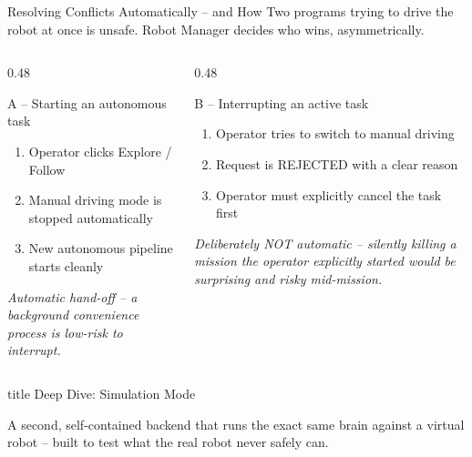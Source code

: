\documentclass[aspectratio=169, 11pt]{beamer}
\begin{document}
\begin{frame}{Resolving Conflicts Automatically -- and How}
  \small
  Two programs trying to drive the robot at once is unsafe. Robot Manager decides who wins, asymmetrically.
  \vspace{0.2cm}
  \begin{columns}[T]
    \begin{column}{0.48\textwidth}
      \begin{block}{A -- Starting an autonomous task}
        \footnotesize
        \begin{enumerate}
          \item Operator clicks Explore / Follow
          \item Manual driving mode is stopped automatically
          \item New autonomous pipeline starts cleanly
        \end{enumerate}
        \textit{Automatic hand-off -- a background convenience process is low-risk to interrupt.}
      \end{block}
    \end{column}
    \begin{column}{0.48\textwidth}
      \begin{block}{B -- Interrupting an active task}
        \footnotesize
        \begin{enumerate}
          \item Operator tries to switch to manual driving
          \item Request is REJECTED with a clear reason
          \item Operator must explicitly cancel the task first
        \end{enumerate}
        \textit{Deliberately NOT automatic -- silently killing a mission the operator explicitly started would be surprising and risky mid-mission.}
      \end{block}
    \end{column}
  \end{columns}
\end{frame}

\begin{frame}
  \vfill
  \centering
  \begin{beamercolorbox}[sep=8pt,center,shadow=true,rounded=true]{title}
    Deep Dive: Simulation Mode\par%
  \end{beamercolorbox}
  \vspace{0.5cm}
  \begin{minipage}{0.75\textwidth}
    \centering\small
    A second, self-contained backend that runs the exact same brain against a virtual robot -- built to test what the real robot never safely can.
  \end{minipage}
  \vfill
\end{frame}
\end{document}
